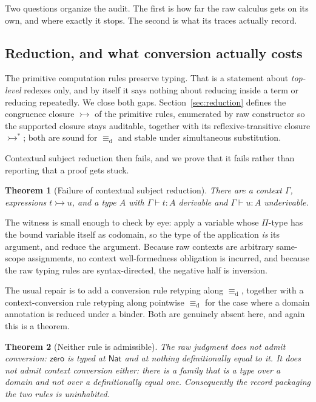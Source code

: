 \documentclass[10pt,reqno]{amsart}
\newtheorem{theorem}{Theorem}[section]
\newcommand{\defeq}{\mathrel{\equiv_{\mathrm d}}}
\newcommand{\ctxred}{\mathrel{\rightarrowtail}}
\newcommand{\ctxredstar}{\mathrel{\rightarrowtail^{*}}}
\begin{document}
Two questions organize the audit.  The first is how far the raw calculus
gets on its own, and where exactly it stops.  The second is what its traces
actually record.

\subsection*{Reduction, and what conversion actually costs}

The primitive computation rules preserve typing.  That is a statement about
\emph{top-level} redexes only, and by itself it says nothing about reducing
inside a term or reducing repeatedly.  We close both gaps.
Section~\ref{sec:reduction} defines the congruence closure \(\ctxred\) of the
primitive rules, enumerated by raw constructor so the supported closure stays
auditable, together with its reflexive-transitive closure \(\ctxredstar\); both
are sound for \(\defeq\) and stable under simultaneous substitution.

Contextual subject reduction then fails, and we prove that it fails rather than
reporting that a proof gets stuck.

\begin{theorem}[Failure of contextual subject reduction]
\label{thm:intro-sr-fails}
There are a context \(\Gamma\), expressions \(t\ctxred u\), and a type \(A\)
with \(\Gamma\vdash t:A\) derivable and \(\Gamma\vdash u:A\) underivable.
\end{theorem}

The witness is small enough to check by eye: apply a variable whose
\(\Pi\)-type has the bound variable itself as codomain, so the type of the
application \emph{is} its argument, and reduce the argument.  Because raw contexts
are arbitrary same-scope assignments, no context well-formedness obligation is
incurred, and because the raw typing rules are syntax-directed, the negative
half is inversion.

The usual repair is to add a conversion rule retyping along \(\defeq\), together
with a context-conversion rule retyping along pointwise \(\defeq\) for the case
where a domain annotation is reduced under a binder.  Both are genuinely absent
here, and again this is a theorem.

\begin{theorem}[Neither rule is admissible]
\label{thm:intro-not-admissible}
The raw judgment does not admit conversion: \(\mathsf{zero}\) is typed at
\(\mathsf{Nat}\) and at nothing definitionally equal to it.  It does not admit
context conversion either: there is a family that is a type over a domain and
not over a definitionally equal one.  Consequently the record packaging the two
rules is uninhabited.
\end{theorem}
\end{document}
